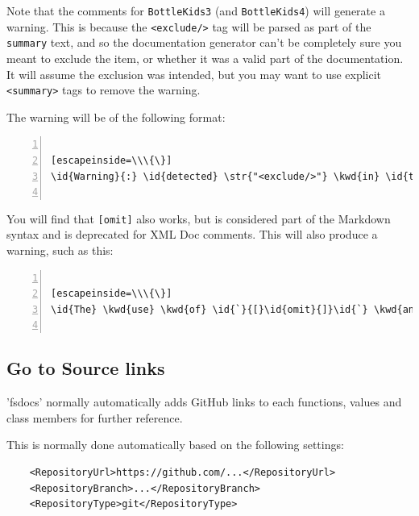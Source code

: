 \documentclass{article}
\newcommand{\id}[1]{\textcolor{black}{#1}}
\newcommand{\com}[1]{\textcolor{officegreen}{#1}}
\newcommand{\kwd}[1]{\textcolor{navy}{#1}}
\newcommand{\str}[1]{\textcolor{olive}{#1}}
\begin{document}
Note that the comments for \texttt{BottleKids3} (and \texttt{BottleKids4}) will generate a warning. This is because
the \texttt{<exclude/>} tag will be parsed as part of the \texttt{summary} text, and so the documentation generator
can't be completely sure you meant to exclude the item, or whether it was a valid part of the documentation.
It will assume the exclusion was intended, but you may want to use explicit \texttt{<summary>} tags to remove
the warning.


The warning will be of the following format:
\begin{lstlisting}[numbers=left]

[escapeinside=\\\{\}]
\id{Warning}{:} \id{detected} \str{"<exclude/>"} \kwd{in} \id{text} \kwd{of} \str{"<summary>"} \kwd{for} \str{"M:YourLib.BottleKids4"}{.} \id{Please} \id{see} \id{https}{:}\com{//fsprojects.github.io/FSharp.Formatting/apidocs.html\#Classic-XML-Doc-Comments}


\end{lstlisting}



You will find that \texttt{[omit]} also works, but is considered part of the Markdown syntax and is
deprecated for XML Doc comments. This will also produce a warning, such as this:
\begin{lstlisting}[numbers=left]

[escapeinside=\\\{\}]
\id{The} \kwd{use} \kwd{of} \id{`}{[}\id{omit}{]}\id{`} \kwd{and} \id{other} \id{commands} \kwd{in} \id{XML} \id{comments} \id{is} \id{deprecated}{,} \id{please} \kwd{use} \id{XML} \id{extensions}{,} \id{see} \id{https}{:}\com{//github.com/fsharp/fslang-design/blob/master/tooling/FST-1031-xmldoc-extensions.md}


\end{lstlisting}

\subsection*{Go to Source links}



'fsdocs' normally automatically adds GitHub links to each functions, values and class members for further reference.


This is normally done automatically based on the following settings:
\begin{lstlisting}
    <RepositoryUrl>https://github.com/...</RepositoryUrl>
    <RepositoryBranch>...</RepositoryBranch>
    <RepositoryType>git</RepositoryType>

\end{lstlisting}
\end{document}
